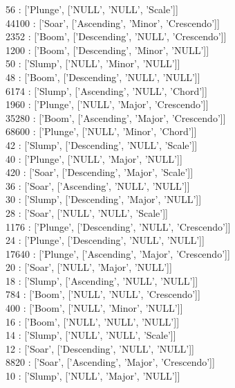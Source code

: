 {56      :  ['Plunge', ['NULL', 'NULL', 'Scale']]\\
44100   :  ['Soar', ['Ascending', 'Minor', 'Crescendo']]\\
2352    :  ['Boom', ['Descending', 'NULL', 'Crescendo']]\\
1200    :  ['Boom', ['Descending', 'Minor', 'NULL']]\\
50      :  ['Slump', ['NULL', 'Minor', 'NULL']]\\
48      :  ['Boom', ['Descending', 'NULL', 'NULL']]\\
6174    :  ['Slump', ['Ascending', 'NULL', 'Chord']]\\
1960    :  ['Plunge', ['NULL', 'Major', 'Crescendo']]\\
35280   :  ['Boom', ['Ascending', 'Major', 'Crescendo']]\\
68600   :  ['Plunge', ['NULL', 'Minor', 'Chord']]\\
42      :  ['Slump', ['Descending', 'NULL', 'Scale']]\\
40      :  ['Plunge', ['NULL', 'Major', 'NULL']]\\
420     :  ['Soar', ['Descending', 'Major', 'Scale']]\\
36      :  ['Soar', ['Ascending', 'NULL', 'NULL']]\\
30      :  ['Slump', ['Descending', 'Major', 'NULL']]\\
28      :  ['Soar', ['NULL', 'NULL', 'Scale']]\\
1176    :  ['Plunge', ['Descending', 'NULL', 'Crescendo']]\\
24      :  ['Plunge', ['Descending', 'NULL', 'NULL']]\\
17640   :  ['Plunge', ['Ascending', 'Major', 'Crescendo']]\\
20      :  ['Soar', ['NULL', 'Major', 'NULL']]\\
18      :  ['Slump', ['Ascending', 'NULL', 'NULL']]\\
784     :  ['Boom', ['NULL', 'NULL', 'Crescendo']]\\
400     :  ['Boom', ['NULL', 'Minor', 'NULL']]\\
16      :  ['Boom', ['NULL', 'NULL', 'NULL']]\\
14      :  ['Slump', ['NULL', 'NULL', 'Scale']]\\
12      :  ['Soar', ['Descending', 'NULL', 'NULL']]\\
8820    :  ['Soar', ['Ascending', 'Major', 'Crescendo']]\\
10      :  ['Slump', ['NULL', 'Major', 'NULL']]\\
}
